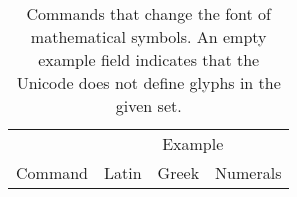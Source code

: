 \begin{table}
  \ExplSyntaxOn

  \NewDocumentCommand{\GStr}{}{
    \Alpha\Beta\Gamma\alpha\beta\gamma\ \ldots}
  \ExplSyntaxOff
  \caption{Commands that change the font of mathematical symbols. An empty
    example field indicates that the Unicode does not define glyphs in the
    given set.}\label{tbl:sym_commands}
  \begin{minipage}{\linewidth}
    \centering
    \begin{tabular}{@{}*4l@{}}
      \toprule
                      & \multicolumn{3}{c}{Example}                                                           \\
      \cmidrule(l){2-4}
      Command         & Latin                        & Greek                          & Numerals              \\
      \midrule


\end{tabular}
\end{minipage}
\end{table}
